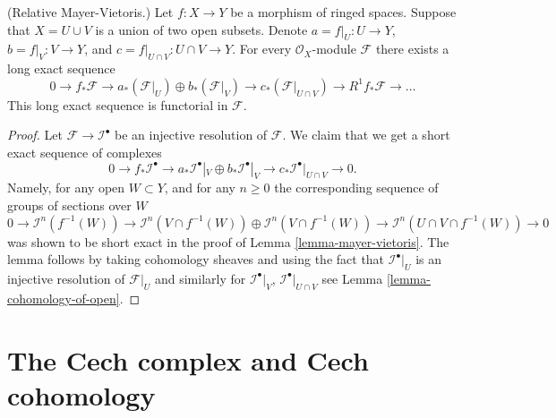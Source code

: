 \begin{lemma}
\label{lemma-relative-mayer-vietoris}
(Relative Mayer-Vietoris.)
Let $f : X \to Y$ be a morphism of ringed spaces.
Suppose that $X = U \cup V$ is a union of two open subsets.
Denote $a = f|_U : U \to Y$, $b = f|_V : V \to Y$, and
$c = f|_{U \cap V} : U \cap V \to Y$.
For every $\mathcal{O}_X$-module $\mathcal{F}$
there exists a long exact sequence
$$
0 \to
f_*\mathcal{F} \to
a_*(\mathcal{F}|_U) \oplus b_*(\mathcal{F}|_V) \to
c_*(\mathcal{F}|_{U \cap V}) \to
R^1f_*\mathcal{F} \to \ldots
$$
This long exact sequence is functorial in $\mathcal{F}$.
\end{lemma}

\begin{proof}
Let $\mathcal{F} \to \mathcal{I}^\bullet$ be an injective resolution
of $\mathcal{F}$. We claim that we 
get a short exact sequence of complexes
$$
0 \to
f_*\mathcal{I}^\bullet \to
a_*\mathcal{I}^\bullet|_V \oplus b_*\mathcal{I}^\bullet|_V \to
c_*\mathcal{I}^\bullet|_{U \cap V} \to
0.
$$
Namely, for any open $W \subset Y$, and for any $n \geq 0$ the
corresponding sequence of groups of sections over $W$
$$
0 \to
\mathcal{I}^n(f^{-1}(W)) \to
\mathcal{I}^n(V \cap f^{-1}(W))
\oplus \mathcal{I}^n(V \cap f^{-1}(W)) \to
\mathcal{I}^n(U \cap V \cap f^{-1}(W)) \to
0
$$
was shown to be short exact in the proof of Lemma \ref{lemma-mayer-vietoris}.
The lemma follows by taking cohomology sheaves and using the fact that
$\mathcal{I}^\bullet|_U$ is an injective resolution of $\mathcal{F}|_U$
and similarly for $\mathcal{I}^\bullet|_V$, $\mathcal{I}^\bullet|_{U \cap V}$
see Lemma \ref{lemma-cohomology-of-open}.
\end{proof}




















\section{The Cech complex and Cech cohomology}
\label{section-cech}

